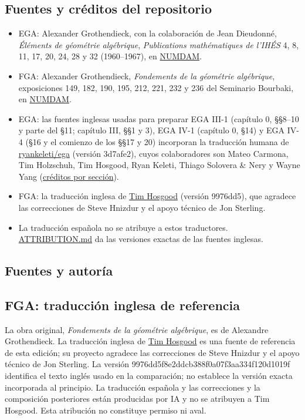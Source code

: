 \documentclass[10pt,oneside,openany]{book}
\theoremstyle{egaenv}\newtheorem*{env}{---}
\theoremstyle{egastatement}
\theoremstyle{egadescription}
\begin{document}
\subsection*{Fuentes y créditos del repositorio}

\begin{itemize}
\item EGA: Alexander Grothendieck, con la colaboración de Jean Dieudonné, \emph{Éléments de géométrie algébrique},
  \emph{Publications mathématiques de l'IHÉS} 4, 8, 11, 17, 20, 24, 28 y 32 (1960–1967), en
  \href{https://www.numdam.org/journals/PMIHES/}{NUMDAM}.
\item FGA: Alexander Grothendieck, \emph{Fondements de la géométrie algébrique}, exposiciones 149, 182, 190, 195, 212, 221,
  232 y 236 del Seminario Bourbaki, en \href{https://www.numdam.org/}{NUMDAM}.
\item EGA: las fuentes inglesas usadas para preparar EGA III-1 (capítulo 0, §§8–10 y parte del §11; capítulo III, §§1 y
  3), EGA IV-1 (capítulo 0, §14) y EGA IV-4 (§16 y el comienzo de los §§17 y 20) incorporan la traducción humana de
  \href{https://github.com/ryankeleti/ega/tree/3d7afe28c99d1887ccdb85acf2ca1afd93fb1971}{ryankeleti/ega} (versión
  3d7afe2), cuyos colaboradores son Mateo Carmona, Tim Holzschuh, Tim Hosgood, Ryan Keleti, Thiago Solovera \& Nery y
  Wayne Yang (\href{https://github.com/ryankeleti/ega/blob/3d7afe28c99d1887ccdb85acf2ca1afd93fb1971/README.md}{créditos por sección}).
\item FGA: la traducción inglesa de \href{https://github.com/thosgood/fga/tree/9976dd5f8e2ddcb388f0a07f3aa334f120d1019f}{Tim Hosgood}
  (versión 9976dd5), que agradece las correcciones de Steve Hnizdur y el apoyo técnico de Jon Sterling.
\item La traducción española no se atribuye a estos traductores. \href{../../tree/repo/ATTRIBUTION.md}{ATTRIBUTION.md} da las versiones exactas
  de las fuentes inglesas.
\end{itemize}

\subsection*{Fuentes y autoría}

\subsection*{FGA: traducción inglesa de referencia}

La obra original, \emph{Fondements de la géométrie algébrique}, es de Alexandre Grothendieck. La traducción inglesa de \href{https://github.com/thosgood/fga/tree/9976dd5f8e2ddcb388f0a07f3aa334f120d1019f}{Tim Hosgood} es una fuente de referencia de esta edición; su proyecto agradece las correcciones de Steve Hnizdur y el apoyo técnico de Jon Sterling. La versión 9976dd5f8e2ddcb388f0a07f3aa334f120d1019f identifica el texto inglés usado en la comparación; no establece la versión exacta incorporada al principio. La traducción española y las correcciones y la composición posteriores están producidas por IA y no se atribuyen a Tim Hosgood. Esta atribución no constituye permiso ni aval.
\end{document}
